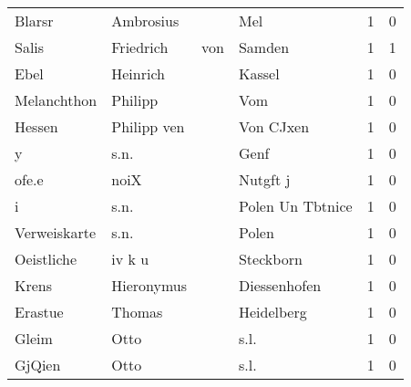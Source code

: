 \begin{center}
\begin{tiny}
\begin{longtabu}{llllrr}
                   Blarsr &                          Ambrosius &             &                                         Mel &          1 &         0 \\
                    Salis &                          Friedrich &         von &                                      Samden &          1 &         1 \\
                     Ebel &                           Heinrich &             &                                      Kassel &          1 &         0 \\
              Melanchthon &                            Philipp &             &                                         Vom &          1 &         0 \\
                   Hessen &                        Philipp ven &             &                                   Von CJxen &          1 &         0 \\
                        y &                               s.n. &             &                                        Genf &          1 &         0 \\
                    ofe.e &                               noiX &             &                                    Nutgft j &          1 &         0 \\
                        i &                               s.n. &             &                            Polen Un Tbtnice &          1 &         0 \\
             Verweiskarte &                               s.n. &             &                                       Polen &          1 &         0 \\
               Oeistliche &                             iv k u &             &                                   Steckborn &          1 &         0 \\
                    Krens &                         Hieronymus &             &                                Diessenhofen &          1 &         0 \\
                  Erastue &                             Thomas &             &                                  Heidelberg &          1 &         0 \\
                    Gleim &                               Otto &             &                                        s.l. &          1 &         0 \\
                   GjQien &                               Otto &             &                                        s.l. &          1 &         0 \\

\end{longtabu}
\end{tiny}
\end{center}

